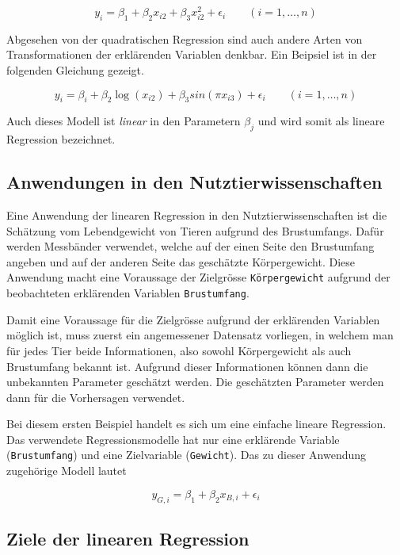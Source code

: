 \documentclass[]{book}
\begin{document}
\begin{equation}y_i = \beta_1 + \beta_2 x_{i2} + \beta_3 x_{i2}^2 + \epsilon_i \qquad (i = 1,\ldots,n)\end{equation}

Abgesehen von der quadratischen Regression sind auch andere Arten von
Transformationen der erklärenden Variablen denkbar. Ein Beipsiel ist in
der folgenden Gleichung gezeigt.

\begin{equation}y_i = \beta_i + \beta_2 \log(x_{i2}) + \beta_3 sin(\pi x_{i3}) + \epsilon_i \qquad (i = 1,\ldots,n)\end{equation}

Auch dieses Modell ist \emph{linear} in den Parametern \(\beta_j\) und
wird somit als lineare Regression bezeichnet.

\subsection{Anwendungen in den
Nutztierwissenschaften}\label{anwendungen-in-den-nutztierwissenschaften}

Eine Anwendung der linearen Regression in den Nutztierwissenschaften ist
die Schätzung vom Lebendgewicht von Tieren aufgrund des Brustumfangs.
Dafür werden Messbänder verwendet, welche auf der einen Seite den
Brustumfang angeben und auf der anderen Seite das geschätzte
Körpergewicht. Diese Anwendung macht eine Voraussage der Zielgrösse
\texttt{Körpergewicht} aufgrund der beobachteten erklärenden Variablen
\texttt{Brustumfang}.

Damit eine Voraussage für die Zielgrösse aufgrund der erklärenden
Variablen möglich ist, muss zuerst ein angemessener Datensatz vorliegen,
in welchem man für jedes Tier beide Informationen, also sowohl
Körpergewicht als auch Brustumfang bekannt ist. Aufgrund dieser
Informationen können dann die unbekannten Parameter geschätzt werden.
Die geschätzten Parameter werden dann für die Vorhersagen verwendet.

Bei diesem ersten Beispiel handelt es sich um eine einfache lineare
Regression. Das verwendete Regressionsmodelle hat nur eine erklärende
Variable (\texttt{Brustumfang}) und eine Zielvariable
(\texttt{Gewicht}). Das zu dieser Anwendung zugehörige Modell lautet

\begin{equation}y_{G,i} = \beta_1 + \beta_2 x_{B,i} + \epsilon_i\end{equation}

\subsection{Ziele der linearen
Regression}\label{ziele-der-linearen-regression}
\end{document}
